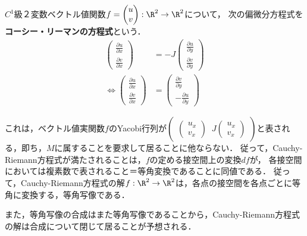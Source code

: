 \documentclass[uplatex, dvipdfmx]{jsreport}
\begin{document}
\begin{definition}
    $C^1$級２変数ベクトル値関数$f=\begin{pmatrix}u\\v\end{pmatrix}:\R^2\to\R^2$について，
    次の偏微分方程式を\textbf{コーシー・リーマンの方程式}という．
    \begin{align*}
        \begin{pmatrix}\frac{\partial u}{\partial x}\\\frac{\partial v}{\partial x}\end{pmatrix} &= -J\begin{pmatrix}\frac{\partial u}{\partial y}\\\frac{\partial v}{\partial y}\end{pmatrix}\\
        \Leftrightarrow\begin{pmatrix}\frac{\partial u}{\partial x}\\\frac{\partial v}{\partial x}\end{pmatrix} &= \begin{pmatrix}\frac{\partial v}{\partial y}\\-\frac{\partial u}{\partial y}\end{pmatrix}
    \end{align*}
\end{definition}
\begin{remark}
    これは，ベクトル値実関数$f$のYacobi行列が$\begin{pmatrix}\begin{pmatrix}u_x\\v_x\end{pmatrix}\;\;J\begin{pmatrix}u_x\\v_x\end{pmatrix}\end{pmatrix}$と表される，即ち，$M$に属することを要求して居ることに他ならない．
    従って，Cauchy-Riemann方程式が満たされることは，$f$の定める接空間上の変換$df$が，
    各接空間においては複素数で表されること＝等角変換であることに同値である．
    従って，Cauchy-Riemann方程式の解$f:\R^2\to\R^2$は，各点の接空間を各点ごとに等角に変換する，等角写像である．

    また，等角写像の合成はまた等角写像であることから，Cauchy-Riemann方程式の解は合成について閉じて居ることが予想される．
\end{remark}
\end{document}
